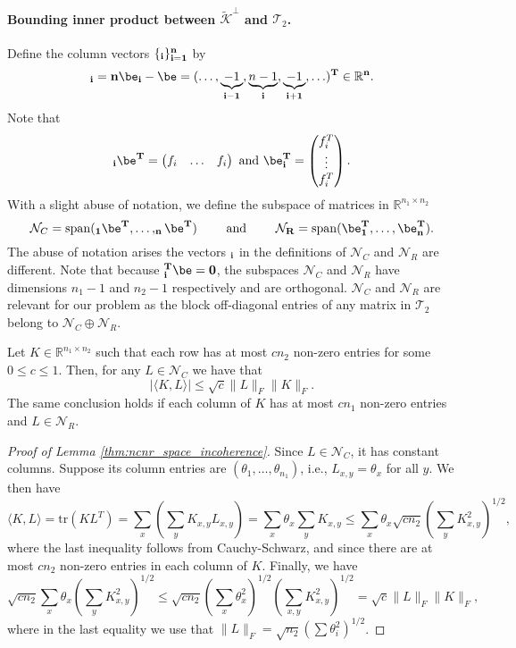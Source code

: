 \paragraph{Bounding inner product between $\tilde{\mathcal{K}}^\perp$ and $\mathcal{T}_2$.}  Define the column vectors $\{\bf_i\}_{i=1}^{n}$ by
$$
\bf_i = n \be_i - \be = (\ldots, \underbrace{-1}_{i-1},\underbrace{n-1}_{i}, \underbrace{-1}_{i+1},\ldots)^T \in \mathbb{R}^{n}.
$$
Note that 
$$ \bf_i \be^T=\begin{pmatrix} f_i & \ldots & f_i\end{pmatrix} \text{ and } \be \bf_i^T=\begin{pmatrix} f_i^T \\ \vdots \\ f_i^T\end{pmatrix}.$$
With a slight abuse of notation, we define the subspace of matrices in $\mathbb{R}^{n_1 \times n_2}$ 
$$
\mathcal{N}_{C} ={\rm span}( \bf_1 \be^T,\ldots,  \bf_n \be^T ) \qquad \text{ and }  \qquad \mathcal{N}_{R}={\rm span}( \be \bf_1^T, \ldots, \be \bf_n^T ).
$$
The abuse of notation arises the vectors $\bf_i$ in the definitions of $\mathcal{N}_{C}$ and $\mathcal{N}_{R}$ are different.  Note that because $\bf_i^T \be = 0$, the subspaces $\mathcal{N}_{C}$ and $\mathcal{N}_{R}$ have dimensions $n_1-1$ and $n_2-1$ respectively and are orthogonal.  
%
$\mathcal{N}_{C}$ and $\mathcal{N}_{R}$ are relevant for our problem as   the block off-diagonal entries of any matrix in  $\mathcal{T}_{2}$ belong to %
$ \mathcal{N}_{C} \oplus \mathcal{N}_{R}.$

\begin{lemma} \label{thm:ncnr_space_incoherence}
Let $K \in \mathbb{R}^{n_1\times n_2}$  such that each row  has at most $c n_2$ non-zero entries for some  $0 \leq c \leq 1$. Then, for any $L \in \mathcal{N}_{C}$   we have that 
$$| \langle K, L \rangle | \leq \sqrt{c} \| L \|_F \| K \|_F.$$
 The same conclusion holds  if each column  of $K$ has at most $c n_1$ non-zero entries and   $L\in \mathcal{N}_R$. 
\end{lemma}

\begin{proof} [Proof of Lemma \ref{thm:ncnr_space_incoherence}]
Since $L \in \mathcal{N}_{C}$, it has constant columns.  Suppose its column entries are $(\theta_1,\ldots,\theta_{n_1})$, i.e., $L_{x,y}=\theta_x$  for all $y$. We then have 
$$\langle K, L \rangle = \mathrm{tr}(KL^T) = \sum_{x} (\sum_{y} K_{x,y} L_{x,y}) = \sum_{x} \theta_x \sum_{y} K_{x,y} {\leq} \sum_{x} \theta_x \sqrt{cn_2} (\sum_{y} K_{x,y}^2)^{1/2},$$  where the last inequality follows from  Cauchy-Schwarz, and since   there are at most $c n_2$ non-zero entries in each column of $K$.  Finally, we  have 
$$\sqrt{cn_2} \sum_{x} \theta_x  (\sum_{y} K_{x,y}^2)^{1/2} \leq \sqrt{cn_2} (\sum_x \theta_x^2)^{1/2} (\sum_{x,y} K_{x,y}^2)^{1/2} = \sqrt{c} \|L\|_F \|K\|_F,$$
 where in the last equality we use  that $\|L\|_F = \sqrt{n_2}(\sum \theta_i^2)^{1/2}$. %
\end{proof}



